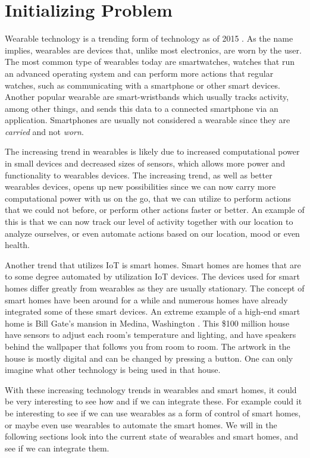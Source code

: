 \section{Initializing Problem}\label{sec:initproblem}
Wearable technology is a trending form of technology as of 2015 \cite{WEARABLESTREND}. 
As the name implies, wearables are devices that, unlike most electronics, are worn by the user. 
The most common type of wearables today are smartwatches, 
\ie watches that run an advanced operating system and can perform more actions that regular watches, 
such as communicating with a smartphone or other smart devices.
Another popular wearable are smart-wristbands which usually tracks activity, 
among other things, and sends this data to a connected smartphone via an application. 
Smartphones are usually not considered a wearable since they are \emph{carried} and not \emph{worn}. 

The increasing trend in wearables is likely due to increased computational power in small devices and decreased sizes of sensors, 
which allows more power and functionality to wearables devices. 
The increasing trend, as well as better wearables devices, 
opens up new possibilities since we can now carry more computational power with us on the go, 
that we can utilize to perform actions that we could not before, 
or perform other actions faster or better. 
An example of this is that we can now track our level of activity together with our location to analyze ourselves, 
or even automate actions based on our location, mood or even health. 

Another trend that utilizes IoT is smart homes.
Smart homes are homes that are to some degree automated by utilization IoT devices. 
The devices used for smart homes differ greatly from wearables as they are usually stationary. 
The concept of smart homes have been around for a while and numerous homes have already integrated some of these smart devices. 
An extreme example of a high-end smart home is Bill Gate's mansion in Medina, Washington \cite{billgatehouse}.
This \$100 million house have sensors to adjust each room's temperature and lighting, 
and have speakers behind the wallpaper that follows you from room to room. 
The artwork in the house is mostly digital and can be changed by pressing a button. 
One can only imagine what other technology is being used in that house. 

With these increasing technology trends in wearables and smart homes, 
it could be very interesting to see how and if we can integrate these. 
For example could it be interesting to see if we can use wearables as a form of control of smart homes, 
or maybe even use wearables to automate the smart homes.
We will in the following sections look into the current state of wearables and smart homes, 
and see if we can integrate them. 
